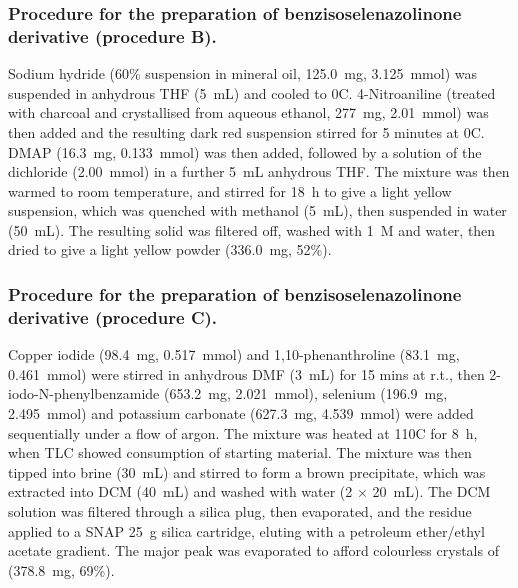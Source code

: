 \begin{refsection}
\subsubsection[Procedure for the preparation of benzisoselenazolinone derivatives (procedure B)]{Procedure for the preparation of benzisoselenazolinone derivative  (procedure B).}
Sodium hydride (60\% suspension in mineral oil, 125.0~mg, 3.125~mmol) was suspended in anhydrous THF (5~mL) and cooled to 0\degree C.
4-Nitroaniline (treated with charcoal and crystallised from aqueous ethanol, 277~mg, 2.01~mmol) was then added and the resulting dark red suspension stirred for 5 minutes at 0\degree C.
DMAP (16.3~mg, 0.133~mmol) was then added, followed by a solution of the dichloride  (2.00~mmol) in a further 5~mL anhydrous THF.
The mixture was then warmed to room temperature, and stirred for 18~h to give a light yellow suspension, which was quenched with methanol (5~mL), then suspended in water (50~mL).
The resulting solid was filtered off, washed with 1~\textsc{M}  and water, then dried to give a light yellow powder (336.0~mg, 52\%).

\subsubsection[Procedure for the preparation of benzisoselenazolinone derivatives (procedure C)]{Procedure for the preparation of benzisoselenazolinone derivative  (procedure C).}
Copper iodide (98.4~mg, 0.517~mmol) and 1,10-phenanthroline (83.1~mg, 0.461~mmol) were stirred in anhydrous DMF (3~mL) for 15 mins at r.t., then 2-iodo-N-phenylbenz\-amide (653.2~mg, 2.021~mmol), selenium (196.9~mg, 2.495~mmol) and potassium carbonate (627.3~mg, 4.539~mmol) were added sequentially under a flow of argon.
The mixture was heated at 110\degree C for 8~h, when TLC showed consumption of starting material.
The mixture was then tipped into brine (30~mL) and stirred to form a brown precipitate, which was extracted into DCM (40~mL) and washed with water (2 $\times$ 20~mL).
The DCM solution was filtered through a silica plug, then evaporated, and the residue applied to a SNAP 25~g silica cartridge, eluting with a petroleum ether/ethyl acetate gradient.
The major peak was evaporated to afford colourless crystals of  (378.8~mg, 69\%).


\end{refsection}
